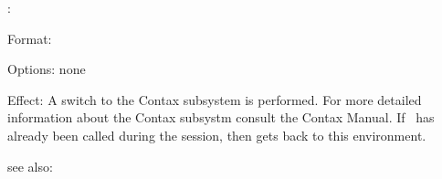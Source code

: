 \colab{} \contax:

Format: 

Options: none

Effect: A switch to the Contax subsystem is performed. For more 
        detailed information about the Contax subsystm consult the 
        Contax Manual. 
	If \contax \ has already been called during the \COLAB{} 
        session, then \COLAB{} gets back to this environment.
       
see also: \colab
